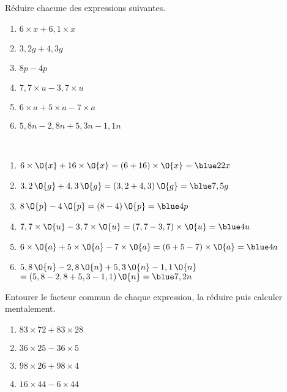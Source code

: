 \exercicesbase

\begin{colonne*exercice}

\begin{exercice} %
   Réduire chacune des expressions suivantes.
   \begin{enumerate}
      \item $6\times x+6,1\times x$
      \item $3,2g+4,3g$
      \item $8p-4p$
      \item $7,7\times u-3,7\times u$
      \item $6\times a+5\times a-7\times a$
      \item $5,8n-2,8n+5,3n-1,1n$ 
   \end{enumerate}
\end{exercice}

\begin{corrige}
   \ \\ [-5mm]
   \begin{enumerate}
      \item $6\times\O{x}+16\times\O{x} =(6+16)\times\O{x} =\blue 22x$
      \item $3,2\,\O{g}+4,3\,\O{g} =(3,2+4,3)\,\O{g} =\blue 7,5g$
      \item $8\,\O{p}-4\,\O{p} =(8-4)\,\O{p} =\blue 4p$
      \item $7,7\times\O{u}-3,7\times\O{u} =(7,7-3,7)\times\O{u} =\blue 4u$
      \item $6\times\O{a}+5\times\O{a}-7\times\O{a} =(6+5-7)\times\O{a} =\blue 4a$
      \item $5,8\,\O{n}-2,8\,\O{n}+5,3\,\O{n}-1,1\,\O{n}$ \\
         \qquad $=(5,8-2,8+5,3-1,1)\,\O{n} =\blue 7,2n$
   \end{enumerate}
\end{corrige}

\bigskip


\begin{exercice} %
   Entourer le facteur commun de chaque expression, la réduire puis calculer mentalement.
   \begin{enumerate}
      \item $83\times72+83 \times28$
      \item $36 \times25-36\times5$
      \item $98\times26+98\times4$
      \item $16\times44-6\times44$
   \end{enumerate}
\end{exercice}


\end{colonne*exercice}
